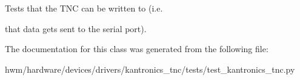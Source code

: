 Tests that the T\-N\-C can be written to (i.\-e. 

that data gets sent to the serial port). 

The documentation for this class was generated from the following file\-:\begin{DoxyCompactItemize}
\item 
hwm/hardware/devices/drivers/kantronics\-\_\-tnc/tests/test\-\_\-kantronics\-\_\-tnc.\-py\end{DoxyCompactItemize}
